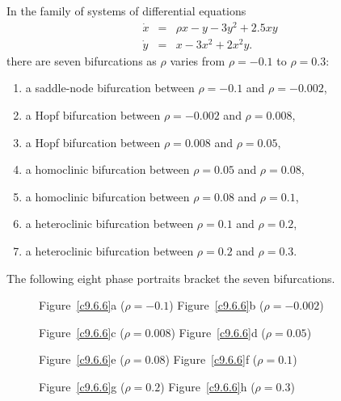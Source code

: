\documentclass{ximera}
\begin{document}
\soln In the family of systems of differential equations  
\[
\begin{array}{rcl}
\dot{x} & = & \rho x-y-3y^2+2.5xy\\
\dot{y} & = & x-3x^2+2x^2y.
\end{array}
\]
there are seven bifurcations as $\rho$ varies from $\rho=-0.1$ to $\rho=0.3$:  
\begin{enumerate}
\item	a saddle-node bifurcation between $\rho=-0.1$ and $\rho=-0.002$,
\item	a Hopf bifurcation between $\rho=-0.002$ and $\rho=0.008$,
\item	a Hopf bifurcation between $\rho=0.008$ and $\rho=0.05$,
\item	a homoclinic bifurcation between $\rho=0.05$ and $\rho=0.08$,
\item	a homoclinic bifurcation between $\rho=0.08$ and $\rho=0.1$,
\item	a heteroclinic bifurcation between $\rho=0.1$ and $\rho=0.2$,
\item	a heteroclinic bifurcation between $\rho=0.2$ and $\rho=0.3$.
\end{enumerate}
The following eight phase portraits bracket the seven bifurcations.
\begin{figure}[htb]
     \centerline{%
     }
     \centerline{Figure~\ref{c9.6.6}a ($\rho = -0.1$)\hspace{1.3in} Figure~\ref{c9.6.6}b ($\rho = -0.002$)}
\end{figure}
\begin{figure}[htb]
     \centerline{%
     }
     \centerline{Figure~\ref{c9.6.6}c ($\rho = 0.008$)\hspace{1.3in} Figure~\ref{c9.6.6}d ($\rho = 0.05$)}
\end{figure}
\begin{figure}[htb]
     \centerline{%
     }
     \centerline{Figure~\ref{c9.6.6}e ($\rho = 0.08$)\hspace{1.3in} Figure~\ref{c9.6.6}f ($\rho = 0.1$)}
\end{figure}
\begin{figure}[htb]
     \centerline{%
     }
     \centerline{Figure~\ref{c9.6.6}g ($\rho = 0.2$)\hspace{1.3in} Figure~\ref{c9.6.6}h ($\rho = 0.3$)}
\end{figure}
\end{document}
